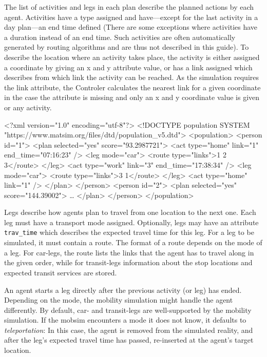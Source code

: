 The list of activities and legs in each plan describe the planned actions by
each agent. Activities have a type assigned and have---except for the last
activity in a day plan---an end time defined (There are some exceptions where
activities have a duration instead of an end time. Such activities are often
automatically generated by routing algorithms and are thus not described in
this guide). To describe the location where an activity takes place, the
activity is either assigned a coordinate by giving an x and y attribute value,
or has a link assigned which describes from which link the activity can be
reached. As the simulation requires the link attribute, the Controler calculates
the nearest link for a given coordinate in the case the attribute is missing and
only an x and y coordinate value is given or any activity.

\begin{xml-file}[caption=An example of a population.xml,
label=lst:BuildingScenarios:populationXml]
<?xml version="1.0" encoding="utf-8"?>
<!DOCTYPE population SYSTEM "https://www.matsim.org/files/dtd/population_v5.dtd">
<population>
	<person id="1">
		<plan selected="yes" score="93.2987721">
			<act type="home" link="1" end_time="07:16:23" />
			<leg mode="car">
				<route type="links">1 2 3</route>
			</leg>
			<act type="work" link="3" end_time="17:38:34" />
			<leg mode="car">
				<route type="links">3 1</route>
			</leg>
			<act type="home" link="1" />
		</plan>
	</person>
	<person id="2">
		<plan selected="yes" score="144.39002">
			\ldots
		</plan>
	</person>
</population>
\end{xml-file}

Legs describe how agents plan to travel from one location to the next one. Each
leg must have a transport mode assigned. Optionally, legs may have an
attribute {\tt trav\_time} which describes the expected travel time for this
leg. For a leg to be simulated, it must contain a route. The format of a
route depends on the mode of a leg. For car-legs, the route lists the links that
the agent has to travel along in the given order, while for transit-legs
information about the stop locations and expected transit services are stored.

An agent starts a leg directly after the previous activity (or leg) has ended.
Depending on the mode, the mobility simulation might handle the agent
differently. By default, car- and transit-legs are well-supported by the
mobility simulation. If the mobsim encounters a mode it does not know, it
defaults to \emph{teleportation}: In this case, the agent is removed from the
simulated reality, and after the leg's expected travel time has passed,
re-inserted at the agent's target location.

